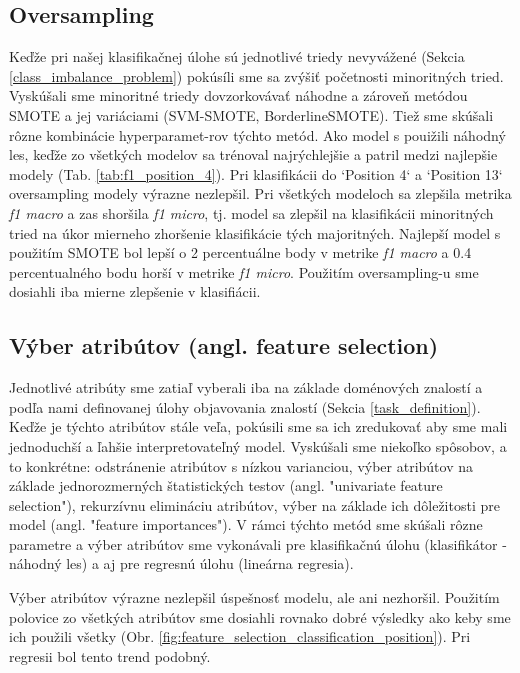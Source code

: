 \documentclass[runningheads]{llncs}
\begin{document}
\subsection{Oversampling}

Keďže pri našej klasifikačnej úlohe sú jednotlivé triedy nevyvážené (Sekcia \ref{class_imbalance_problem}) pokúsíli sme sa zvýšiť početnosti minoritných tried. Vyskúšali sme minoritné triedy dovzorkovávať náhodne a zároveň metódou SMOTE a jej variáciami (SVM-SMOTE, BorderlineSMOTE). Tiež sme skúšali rôzne kombinácie hyperparamet-rov týchto metód.
Ako model s pouižili náhodný les, keďže zo všetkých modelov sa trénoval najrýchlejšie a patril medzi najlepšie modely (Tab. \ref{tab:f1_position_4}). Pri klasifikácii do `Position 4` a `Position 13` oversampling modely výrazne nezlepšil.
Pri všetkých modeloch sa zlepšila metrika \textit{f1 macro} a zas shoršila \textit{f1 micro}, tj. model sa zlepšil na klasifikácii minoritných tried na úkor mierneho zhoršenie klasifikácie tých majoritných.
Najlepší model s použitím SMOTE bol lepší o 2 percentuálne body v metrike \textit{f1 macro} a 0.4 percentualného bodu horší v metrike \textit{f1 micro}.
Použitím oversampling-u sme dosiahli iba mierne zlepšenie v klasifiácii.

\subsection{Výber atribútov (angl. feature selection)}

Jednotlivé atribúty sme zatiaľ vyberali iba na základe doménových znalostí a podľa nami definovanej úlohy objavovania znalostí (Sekcia \ref{task_definition}). Keďže je týchto atribútov stále veľa, pokúsili sme sa ich zredukovať aby sme mali jednoduchší a ľahšie interpretovateľný model. Vyskúšali sme niekoľko spôsobov, a to konkrétne: odstránenie atribútov s nízkou varianciou, výber atribútov na základe jednorozmerných štatistických testov (angl. "univariate feature selection"), rekurzívnu elimináciu atribútov, výber na základe ich dôležitosti pre model (angl. "feature importances"). V rámci týchto metód sme skúšali rôzne parametre a výber atribútov sme vykonávali pre klasifikačnú úlohu (klasifikátor - náhodný les) a aj pre regresnú úlohu (lineárna regresia).

Výber atribútov výrazne nezlepšil úspešnosť modelu, ale ani nezhoršil. Použitím polovice zo všetkých atribútov sme dosiahli rovnako dobré výsledky ako keby sme ich použili všetky (Obr. \ref{fig:feature_selection_classification_position}). Pri regresii bol tento trend podobný.
\end{document}
